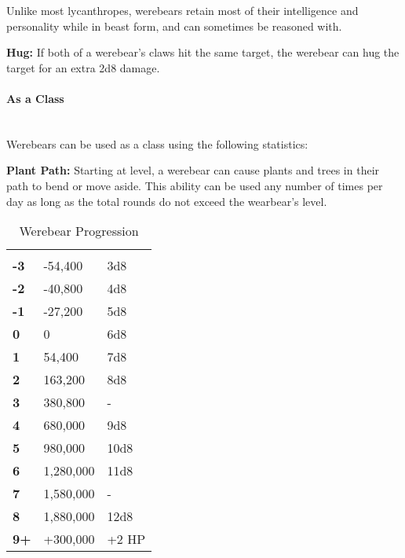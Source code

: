 \begin{multicols*}{2}
Unlike most lycanthropes, werebears retain most of their intelligence and personality while in beast form, and can sometimes be reasoned with.

\textbf{Hug:} If both of a werebear’s claws hit the same target, the werebear can hug the target for an extra 2d8 damage.

\paragraph{As a Class}\mbox{}\\
Werebears can be used as a class using the following statistics:

\textbf{Plant Path:} Starting at  level, a werebear can cause plants and trees in their path to bend or move aside. This ability can be used any number of times per day as long as the total rounds do not exceed the wearbear's level.


\begin {table}[H]
  \caption{Werebear Progression}
  \begin{tabularx}{\columnwidth}{>{\bfseries}YYY}
   &  & \\
	-3 & -54,400 & 3d8\\
	-2 & -40,800 & 4d8\\
	-1 & -27,200 & 5d8\\
	0 & 0 & 6d8\\
	1 & 54,400 & 7d8\\
	2 & 163,200 & 8d8\\
	3 & 380,800 & -\\
	4 & 680,000 & 9d8\\
	5 & 980,000 & 10d8\\
	6 & 1,280,000 & 11d8\\
	7 & 1,580,000 & -\\
	8 & 1,880,000 & 12d8\\
	9+ & +300,000 & +2 HP
  \end {tabularx}
\end {table}


\end{multicols*}
